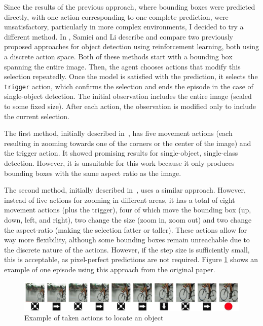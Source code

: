 \documentclass[
  digital,     %
  oneside,     %
  nosansbold,  %
  nocolorbold, %
  lof,         %
  lot,         %
]{fithesis4}
\begin{document}
Since the results of the previous approach, where bounding boxes were predicted directly, with one action corresponding to one complete prediction, were unsatisfactory, particularly in more complex environments, I decided to try a different method. In \cite{rl_object_detection}, Samiei and Li describe and compare two previously proposed approaches for object detection using reinforcement learning, both using a discrete action space. Both of these methods start with a bounding box spanning the entire image. Then, the agent chooses actions that modify this selection repeatedly. Once the model is satisfied with the prediction, it selects the \texttt{trigger} action, which confirms the selection and ends the episode in the case of single-object detection. The initial observation includes the entire image (scaled to some fixed size). After each action, the observation is modified only to include the current selection.

The first method, initially described in~\cite{hierarchical_od_with_drl}, has five movement actions (each resulting in zooming towards one of the corners or the center of the image) and the trigger action. It showed promising results for single-object, single-class detection. However, it is unsuitable for this work because it only produces bounding boxes with the same aspect ratio as the image.

The second method, initially described in~\cite{iterative_od_with_rl}, uses a similar approach. However, instead of five actions for zooming in different areas, it has a total of eight movement actions (plus the trigger), four of which move the bounding box (up, down, left, and right), two change the size (zoom in, zoom out) and two change the aspect-ratio (making the selection fatter or taller). These actions allow for way more flexibility, although some bounding boxes remain unreachable due to the discrete nature of the actions. However, if the step size is sufficiently small, this is acceptable, as pixel-perfect predictions are not required. Figure \ref{fig:exmaple_from_paper} shows an example of one episode using this approach from the original paper.

\begin{figure}
    \centering
    \includegraphics[width=1\linewidth]{diagrams/45.jpg}
    \caption{Example of taken actions to locate an object~\cite{iterative_od_with_rl}}
    \label{fig:exmaple_from_paper}
\end{figure}
\end{document}
